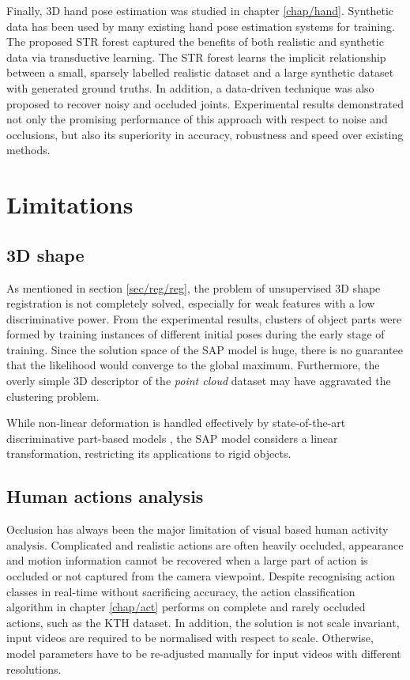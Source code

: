 Finally, 3D hand pose estimation was studied in chapter \ref{chap/hand}. Synthetic data has been used by many existing hand pose estimation systems for training. The proposed STR forest captured the benefits of both realistic and synthetic data via transductive learning. The STR forest learns the implicit relationship between a small, sparsely labelled realistic dataset and a large synthetic dataset with generated ground truths. In addition, a data-driven technique was also proposed to recover noisy and occluded joints. Experimental results demonstrated not only the promising performance of this approach with respect to noise and occlusions, but also its superiority in accuracy, robustness and speed over existing methods.

\section{Limitations}

\subsection{3D shape} 

As mentioned in section \ref{sec/reg/reg}, the problem of unsupervised 3D shape registration is not completely solved, especially for weak features with a low discriminative power. From the experimental results, clusters of object parts were formed by training instances of different initial poses during the early stage of training. Since the solution space of the SAP model is huge, there is no guarantee that the likelihood would converge to the global maximum. Furthermore, the overly simple 3D descriptor of the \emph{point cloud} dataset may have aggravated the clustering problem.   

While non-linear deformation is handled effectively by state-of-the-art discriminative part-based models \cite{Felzenszwalb2010, Andriluka2009, Pishchulin2012}, the SAP model considers a linear transformation, restricting its applications to rigid objects. 

\subsection{Human actions analysis} 

Occlusion has always been the major limitation of visual based human activity analysis. Complicated and realistic actions are often heavily occluded, appearance and motion information cannot be recovered when a large part of action is occluded or not captured from the camera viewpoint. 
Despite recognising action classes in real-time without sacrificing accuracy, the action classification algorithm in chapter \ref{chap/act} performs on complete and rarely occluded actions, such as the KTH dataset. 
In addition, the solution is not scale invariant, input videos are required to be normalised with respect to scale. Otherwise, model parameters have to be re-adjusted manually for input videos with different resolutions.  

